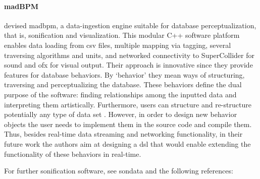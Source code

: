 \paragraph{madBPM}
\citeauthor{icmc/bbp2372.2017.087} \parencite{icmc/bbp2372.2017.087} devised \gls{madbpm}, a data-ingestion engine suitable for database perceptualization, that is, sonification and visualization. This modular C++ software platform enables data loading from \gls{csv} files, multiple mapping via tagging, several traversing algorithms and units, and networked connectivity to SuperCollider for sound and \gls{ofx} for visual output. Their approach is innovative since they provide features for database behaviors. By `behavior' they mean ways of structuring, traversing and perceptualizing the database. These behaviors define the dual purpose of the software: finding relationships among the inputted data and interpreting them artistically. Furthermore, users can structure and re-structure potentially any type of data set \parencite[504]{icmc/bbp2372.2017.087}. However, in order to design new behavior objects the user needs to implement them in the source code and compile them. Thus, besides real-time data streaming and networking functionality, in their future work the authors aim at designing a \gls{dsl} that would enable extending the functionality of these behaviors in real-time.

For further sonification software, see \gls{sondata} and the following references: \parencite{Wil96:Lis, pauletto04, Lod98:MUS, Bei09:Aes, Her14:Aso, DBLP:conf/icad/2007/Worral,DBLP:conf/icad/2003/Walker, domenico_vicinanza_2006_849321}

